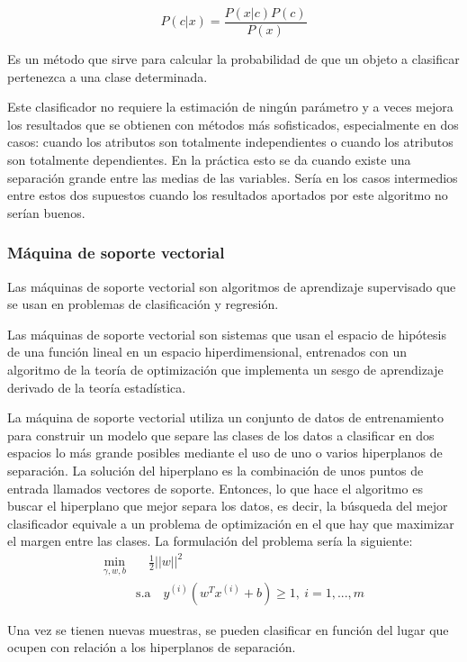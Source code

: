 \documentclass[11pt,a4paper,spanish]{article} %
\begin{document}
$$P(c|x) = \frac{P(x|c) P(c)}{P(x)}$$

Es un método que sirve para calcular la probabilidad de que un objeto a clasificar pertenezca a una clase determinada.

Este clasificador no requiere la estimación de ningún parámetro y a veces mejora los resultados que se obtienen con métodos más sofisticados, especialmente en dos casos: cuando los atributos son totalmente independientes o cuando los atributos son totalmente dependientes. En la práctica esto se da cuando existe una separación grande entre las medias de las variables. Sería en los casos intermedios entre estos dos supuestos cuando los resultados aportados por este algoritmo no serían buenos.   



\subsubsection{Máquina de soporte vectorial}
Las máquinas de soporte vectorial son algoritmos de aprendizaje supervisado que se usan en problemas de clasificación y regresión. 

Las máquinas de soporte vectorial son sistemas que usan el espacio de hipótesis de una función lineal en un espacio hiperdimensional, entrenados con un algoritmo de la teoría de optimización que implementa un sesgo de aprendizaje derivado de la teoría estadística.

La máquina de soporte vectorial utiliza un conjunto de datos de entrenamiento para construir un modelo que separe las clases de los datos a clasificar en dos espacios lo más grande posibles mediante el uso de uno o varios hiperplanos de separación. La solución del hiperplano es la combinación de unos puntos de entrada llamados vectores de soporte. Entonces, lo que hace el algoritmo es buscar el hiperplano que mejor separa los datos, es decir, la búsqueda del mejor clasificador equivale a un problema de optimización en el que hay que maximizar el margen entre las clases. La formulación del problema sería la siguiente:
\begin{align*}
\min _{\gamma, w, b}&\quad \frac{1}{2} ||w||^2 \\
		& \mbox{s.a} \quad y^{(i)}(w^T x^{(i)} + b) \ge 1, \ i=1, ..., m
\end{align*}

Una vez se tienen nuevas muestras, se pueden clasificar en función del lugar que ocupen con relación a los hiperplanos de separación. 
\end{document}
